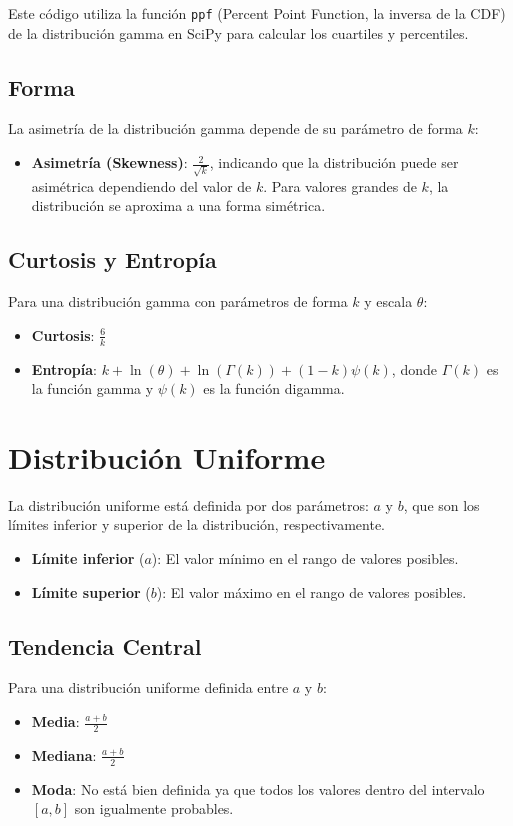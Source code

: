 \documentclass[11pt]{article}
\begin{document}
Este código utiliza la función \texttt{ppf} (Percent Point Function, la inversa de la CDF) de la distribución gamma en SciPy para calcular los cuartiles y percentiles.


\subsection*{Forma}
La asimetría de la distribución gamma depende de su parámetro de forma \(k\):
\begin{itemize}
	\item \textbf{Asimetría (Skewness)}: \(\frac{2}{\sqrt{k}}\), indicando que la distribución puede ser asimétrica dependiendo del valor de \(k\). Para valores grandes de \(k\), la distribución se aproxima a una forma simétrica.
\end{itemize}

\subsection*{Curtosis y Entropía}
Para una distribución gamma con parámetros de forma \(k\) y escala \(\theta\):
\begin{itemize}
	\item \textbf{Curtosis}: \(\frac{6}{k}\)
	\item \textbf{Entropía}: \(k + \ln(\theta) + \ln(\Gamma(k)) + (1-k) \psi(k)\), donde \(\Gamma(k)\) es la función gamma y \(\psi(k)\) es la función digamma.
\end{itemize}



\section*{Distribución Uniforme}
La distribución uniforme está definida por dos parámetros: \(a\) y \(b\), que son los límites inferior y superior de la distribución, respectivamente.
\begin{itemize}
	\item \textbf{Límite inferior} (\(a\)): El valor mínimo en el rango de valores posibles.
	\item \textbf{Límite superior} (\(b\)): El valor máximo en el rango de valores posibles.
\end{itemize}

\subsection*{Tendencia Central}
Para una distribución uniforme definida entre \(a\) y \(b\):
\begin{itemize}
	\item \textbf{Media}: \(\frac{a + b}{2}\)
	\item \textbf{Mediana}: \(\frac{a + b}{2}\)
	\item \textbf{Moda}: No está bien definida ya que todos los valores dentro del intervalo \([a, b]\) son igualmente probables.
\end{itemize}
\end{document}
